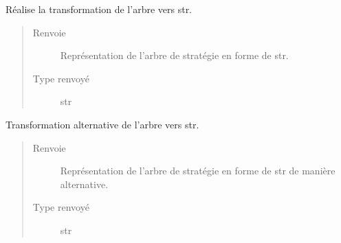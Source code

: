 \documentclass[letterpaper,10pt,french]{sphinxmanual}
\begin{document}
\begin{fulllineitems}
\begin{fulllineitems}
\begin{quote}
\begin{description}
\end{description}\end{quote}

\end{fulllineitems}


\begin{fulllineitems}
\label{\detokenize{index:StrategyTree.StrategyTree.str_alt}}
Réalise la transformation de l’arbre vers str.
\begin{quote}\begin{description}
\item[{Renvoie}] \leavevmode
{} \textendash{} Représentation de l’arbre de stratégie en forme de str.

\item[{Type renvoyé}] \leavevmode
str

\end{description}\end{quote}

\end{fulllineitems}


\begin{fulllineitems}
\label{\detokenize{index:StrategyTree.StrategyTree.str_alt_2}}
Transformation alternative de l’arbre vers str.
\begin{quote}\begin{description}
\item[{Renvoie}] \leavevmode
{} \textendash{} Représentation de l’arbre de stratégie en forme de str de manière
alternative.

\item[{Type renvoyé}] \leavevmode
str

\end{description}\end{quote}

\end{fulllineitems}



\end{fulllineitems}
\end{document}
